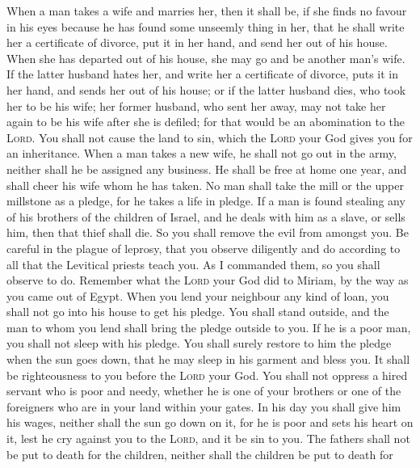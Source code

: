  When a man takes a wife and marries her, then it shall
be, if she finds no favour in his eyes because he has found some
unseemly thing in her, that he shall write her a certificate of divorce,
put it in her hand, and send her out of his house.  When
she has departed out of his house, she may go and be another man's wife.
 If the latter husband hates her, and write her a
certificate of divorce, puts it in her hand, and sends her out of his
house; or if the latter husband dies, who took her to be his wife;
 her former husband, who sent her away, may not take her
again to be his wife after she is defiled; for that would be an
abomination to the \textsc{Lord}. You shall not cause the land to sin,
which the \textsc{Lord} your God gives you for an inheritance.
 When a man takes a new wife, he shall not go out in the
army, neither shall he be assigned any business. He shall be free at
home one year, and shall cheer his wife whom he has taken.
 No man shall take the mill or the upper millstone as a
pledge, for he takes a life in pledge.  If a man is found
stealing any of his brothers of the children of Israel, and he deals
with him as a slave, or sells him, then that thief shall die. So you
shall remove the evil from amongst you.  Be careful in the
plague of leprosy, that you observe diligently and do according to all
that the Levitical priests teach you. As I commanded them, so you shall
observe to do.  Remember what the \textsc{Lord} your God
did to Miriam, by the way as you came out of Egypt.  When
you lend your neighbour any kind of loan, you shall not go into his
house to get his pledge.  You shall stand outside, and
the man to whom you lend shall bring the pledge outside to you.
 If he is a poor man, you shall not sleep with his
pledge.  You shall surely restore to him the pledge when
the sun goes down, that he may sleep in his garment and bless you. It
shall be righteousness to you before the \textsc{Lord} your God.
 You shall not oppress a hired servant who is poor and
needy, whether he is one of your brothers or one of the foreigners who
are in your land within your gates.  In his day you shall
give him his wages, neither shall the sun go down on it, for he is poor
and sets his heart on it, lest he cry against you to the \textsc{Lord},
and it be sin to you.  The fathers shall not be put to
death for the children, neither shall the children be put to death for
